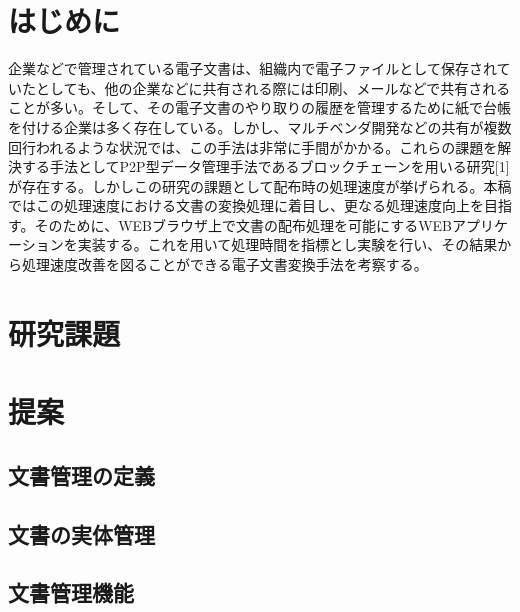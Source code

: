 \documentclass[10.5pt,a4paper,twocolumn]{jsarticle}
\title{\textbf{\title}}
\author{{指導教員}\hspace{1.2em}{\gt \teachername} \\ 
{\sf \studentid}\hspace{1.5em}{\gt \studentname}}
\date{}
\begin{document}
\pagestyle{empty}

\maketitle


\section{はじめに}
企業などで管理されている電子文書は、組織内で電子ファイルとして保存されていたとしても、他の企業などに共有される際には印刷、メールなどで共有されることが多い。そして、その電子文書のやり取りの履歴を管理するために紙で台帳を付ける企業は多く存在している。しかし、マルチベンダ開発などの共有が複数回行われるような状況では、この手法は非常に手間がかかる。これらの課題を解決する手法としてP2P型データ管理手法であるブロックチェーンを用いる研究[1]が存在する。しかしこの研究の課題として配布時の処理速度が挙げられる。本稿ではこの処理速度における文書の変換処理に着目し、更なる処理速度向上を目指す。そのために、WEBブラウザ上で文書の配布処理を可能にするWEBアプリケーションを実装する。これを用いて処理時間を指標とし実験を行い、その結果から処理速度改善を図ることができる電子文書変換手法を考察する。

\section{研究課題}

\section{提案}
\subsection{文書管理の定義}
\subsection{文書の実体管理}
\subsection{文書管理機能}

\end{document}
